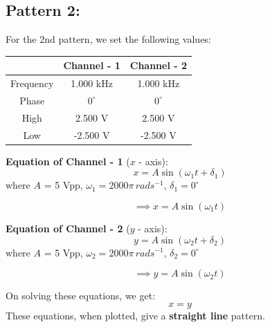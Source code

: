 \documentclass[12pt]{article}
\begin{document}
\subsection{Pattern 2:}
For the 2nd pattern, we set the following values:
\begin{table}[H]
    \centering
    \begin{tabular}{|c|c|c|}
    \hline
        & \textbf{Channel - 1} & \textbf{Channel - 2}\\
    \hline
    Frequency & 1.000 kHz & 1.000 kHz\\
    \hline
    Phase     & $0^{\circ}$ & $0^{\circ}$\\
    \hline
    High      & 2.500 V & 2.500 V\\
    \hline
    Low       & -2.500 V & -2.500 V\\
    \hline
    \end{tabular}
\end{table}

\textbf{Equation of Channel - 1} ($x$ - axis):
\[
x = A \sin{\left(\omega_1 t + \delta_1\right)}
\]
where $A$ = 5 Vpp, $\omega_1 = 2000 \pi \, rad s^{-1}$, $\delta_1 = 0^{\circ}$

\[
\implies x = A \sin{\left(\omega_1 t\right)}
\]

\textbf{Equation of Channel - 2} ($y$ - axis):
\[
y = A \sin{\left(\omega_2 t + \delta_2\right)}
\]
where $A$ = 5 Vpp, $\omega_2 = 2000 \pi \, rad s^{-1}$, $\delta_2 = 0^{\circ}$

\[
\implies y = A \sin{\left(\omega_2 t\right)}
\]

On solving these equations, we get:
\[
x = y
\]
These equations, when plotted, give a \textbf{straight line} pattern.
\end{document}
